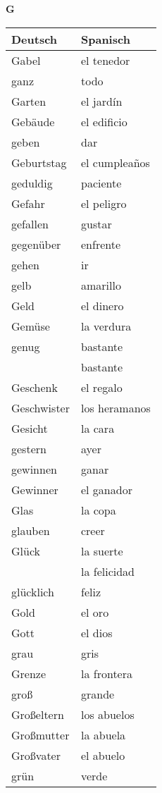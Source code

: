 \begin{flushright}\begin{Huge}\textbf{G}\end{Huge}\end{flushright}

\begin{longtable}{p{} p{}} 
\textbf{Deutsch}     & \textbf{Spanisch}                                       \\ \hline
\hline
\endhead %
Gabel & el tenedor\\
ganz & todo\\
Garten & el jardín\\
Gebäude & el edificio\\
geben & dar\\
Geburtstag & el cumpleaños\\
geduldig & paciente\\
Gefahr & el peligro\\
gefallen & gustar\\
gegenüber & enfrente\\
gehen & ir\\
gelb & amarillo \\
Geld & el dinero\\
Gemüse & la verdura\\
genug & bastante\\
~ & bastante\\
Geschenk & el regalo\\
Geschwister & los heramanos \\
Gesicht & la cara\\
gestern & ayer\\
gewinnen & ganar\\
Gewinner & el ganador\\
Glas & la copa\\
glauben & creer\\
Glück & la suerte \\
~ & la felicidad \\
glücklich & feliz\\
Gold & el oro\\
Gott & el dios\\
grau & gris \\
Grenze & la frontera\\
groß & grande\\
Großeltern & los abuelos\\
Großmutter & la abuela\\
Großvater & el abuelo\\
grün & verde\\

\end{longtable}
